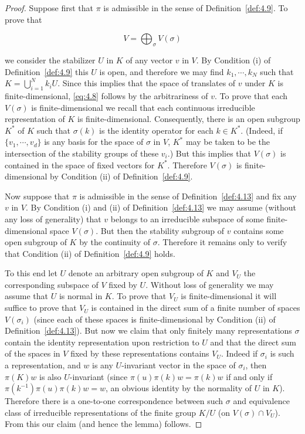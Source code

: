 \begin{proof}

Suppose first that $\pi$ is admissible in the sense of Definition~\ref{def:4.9}. To prove that

\begin{equation}\label{eq:4.8}
V = \bigoplus_{\sigma} V(\sigma)\tag{4.8}
\end{equation}

we consider the stabilizer $U$ in $K$ of any vector $v$ in $V$. By Condition (i) of Definition~\ref{def:4.9} this $U$ is open, and therefore we may find $k_1, \cdots, k_N$ such that $K = \bigcup_{i=1}^{N} k_iU$. Since this implies that the space of translates of $v$ under $K$ is finite-dimensional, \eqref{eq:4.8} follows by the arbitrariness of $v$. To prove that each $V(\sigma)$ is finite-dimensional we recall that each continuous irreducible representation of $K$ is finite-dimensional. Consequently, there is an open subgroup $K^{*}$ of $K$ such that $\sigma(k)$ is the identity operator for each $k \in K^{*}$. (Indeed, if $\{v_1, \cdots, v_d\}$ is any basis for the space of $\sigma$ in $V$, $K^{*}$ may be taken to be the intersection of the stability groups of these $v_i$.) But this implies that $V(\sigma)$ is contained in the space of fixed vectors for $K^{*}$. Therefore $V(\sigma)$ is finite-dimensional by Condition (ii) of Definition~\ref{def:4.9}.

Now suppose that $\pi$ is admissible in the sense of Definition~\ref{def:4.13} and fix any $v$ in $V$. By Condition (i) and (ii) of Definition~\ref{def:4.13} we may assume (without any loss of generality) that $v$ belongs to an irreducible subspace of some finite-dimensional space $V(\sigma)$. But then the stability subgroup of $v$ contains some open subgroup of $K$ by the continuity of $\sigma$. Therefore it remains only to verify that Condition (ii) of Definition~\ref{def:4.9} holds.

To this end let $U$ denote an arbitrary open subgroup of $K$ and $V_U$ the corresponding subspace of $V$ fixed by $U$. Without loss of generality we may assume that $U$ is normal in $K$. To prove that $V_U$ is finite-dimensional it will suffice to prove that $V_U$ is contained in the direct sum of a finite number of spaces $V(\sigma_i)$ (since each of these spaces is finite-dimensional by Condition (ii) of Definition~\ref{def:4.13}). But now we claim that only finitely many representations $\sigma$ contain the identity representation upon restriction to $U$ and that the direct sum of the spaces in $V$ fixed by these representations contains $V_U$. Indeed if $\sigma_i$ is such a representation, and $w$ is any $U$-invariant vector in the space of $\sigma_i$, then $\pi(K)w$ is also $U$-invariant (since $\pi(u)\pi(k)w = \pi(k)w$ if and only if $\pi(k^{-1})\pi(u)\pi(k)w = w$, an obvious identity by the normality of $U$ in $K$). Therefore there is a one-to-one correspondence between such $\sigma$ and equivalence class of irreducible representations of the finite group $K/U$ (on $V(\sigma) \cap V_U$). From this our claim (and hence the lemma) follows.

\end{proof}

